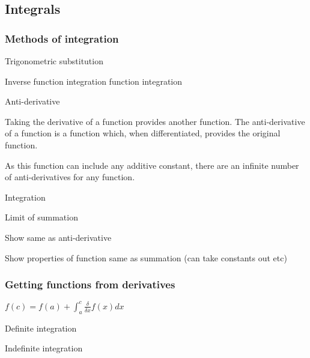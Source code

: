 
\subsection{Integrals}

\subsubsection{Methods of integration}

Trigonometric substitution

Inverse function integration function integration

Anti-derivative

Taking the derivative of a function provides another function. The anti-derivative of a function is a function which, when differentiated, provides the original function.

As this function can include any additive constant, there are an infinite number of anti-derivatives for any function.

Integration

Limit of summation

Show same as anti-derivative

Show properties of function same as summation (can take constants out etc)

\subsubsection{Getting functions from derivatives}

$f(c)=f(a)+\int^c_a \frac{\delta }{\delta x}f(x) dx$

Definite integration

Indefinite integration

